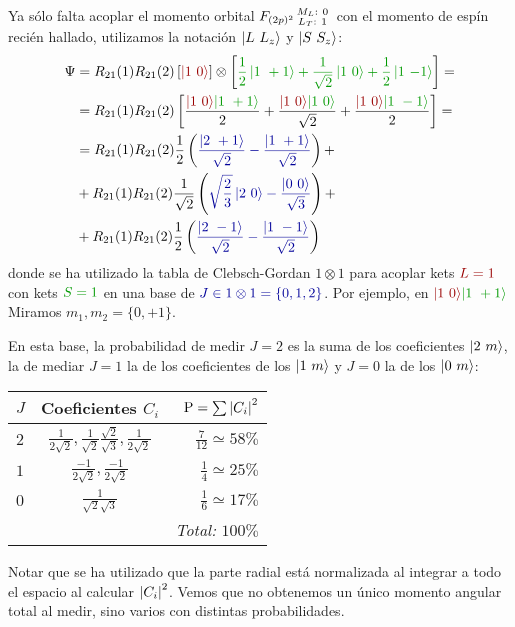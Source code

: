 Ya sólo falta acoplar el momento orbital $F_{(2p)^2}\smqty{M_L:\ 0 \\ L_T:\ 1}$
con el momento de espín recién hallado, utilizamos la notación
$\ket{L\ L_z}$ y $\ket{S\ S_z}$:
\begin{equation}
  \begin{split}
    \Psi &= R_{21}(1)R_{21}(2) \left[ \textcolor{red!60!black}{\ket{1\ 0}} \right] \otimes
    \left[  \textcolor{green!60!black}{
      \frac{1}{2}\ket{1\ +1} + \frac{1}{\sqrt{2}}\ket{1\ 0} +
      \frac{1}{2}\ket{1\ {-1}}
      }
    \right] = \\
    &= R_{21}(1)R_{21}(2) \left[ \frac{
        \textcolor{red!60!black}{\ket{1\ 0}}
          \textcolor{green!60!black}{\ket{1\ +1}}
        }{2} +
      \frac{
        \textcolor{red!60!black}{\ket{1\ 0}}
       \textcolor{green!60!black}{ \ket{1\ 0}}
      }{\sqrt{2}} + \frac{
       \textcolor{red!60!black}{ \ket{1\ 0}}
        \textcolor{green!60!black}{\ket{1\ -1}}
      }{2} \right] = \\
    &= R_{21}(1)R_{21}(2) \frac{1}{2}\left( 
      \textcolor{blue!60!black}{\frac{\ket{2\ +1}}{\sqrt{2}} - \frac{\ket{1\ +1}}{\sqrt{2}} }
    \right) + \\
    &+ R_{21}(1)R_{21}(2) \frac{1}{\sqrt{2}} \left(
      \textcolor{blue!60!black}{
        \sqrt{\frac{2}{3}}\ket{2\ 0} - \frac{\ket{0\ 0}}{\sqrt{3}}
      }
      \right) + \\
    &+ R_{21}(1)R_{21}(2) \frac{1}{2} \left(
      \textcolor{blue!60!black}{\frac{\ket{2\ -1}}{\sqrt{2}} - \frac{\ket{1\ -1}}{\sqrt{2}}}
      \right) \\
  \end{split}
\end{equation}
donde se ha utilizado la tabla de Clebsch-Gordan $1\otimes1$ para
acoplar kets $\textcolor{red!60!black}{L=1}$ con kets
$\textcolor{green!60!black}{S=1}$ en una base de
$\textcolor{blue!60!black}{J\in1\otimes1=\{0,1,2\}}$. Por ejemplo, en
$\textcolor{red!60!black}{\ket{1\ 0}}
\textcolor{green!60!black}{\ket{1\ +1}}$ Miramos $m_1,m_2=\{0,+1\}$.

En esta base, la probabilidad de medir $J=2$ es la suma de los
coeficientes $\ket{2 \ m}$, la de mediar $J=1$ la de los coeficientes
de los $\ket{1\ m}$ y $J=0$ la de los $\ket{0\ m}$:
\begin{center}
  \begin{tabular}{lcr}
    $J$ & Coeficientes $C_i$ & $\text{P}=\sum \abs{C_i}^2$ \\ \hline
    $2$ & $\frac{1}{2\sqrt{2}}, \frac{1}{\sqrt{2}}\frac{\sqrt{2}}{\sqrt{3}},\frac{1}{2\sqrt{2}}$ & $\frac{7}{12} \simeq 58\%$ \\
    $1$ & $\frac{-1}{2\sqrt{2}},\frac{-1}{2\sqrt{2}}$ & $\frac{1}{4}\simeq 25\%$ \\
    $0$ & $\frac{1}{\sqrt{2}\sqrt{3}}$ & $\frac{1}{6} \simeq 17\%$ \\
    & & \emph{Total: }$100\%$
  \end{tabular}
\end{center}
Notar que se ha utilizado que la parte radial está normalizada al
integrar a todo el espacio al calcular $\abs{C_i}^2$. Vemos que no
obtenemos un único momento angular total al medir, sino varios con
distintas probabilidades.

